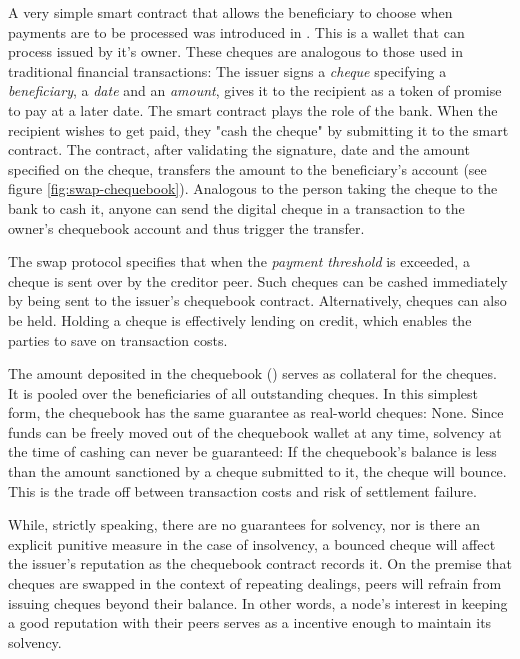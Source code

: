 A very simple smart contract that allows the beneficiary to choose when payments are to be processed was introduced in \cite{ethersphere2016sw3}. This  is a wallet that can process  issued by it's owner. These cheques are analogous to those used in traditional financial transactions: The issuer signs a \emph{cheque} specifying a \emph{beneficiary}, a \emph{date} and an \emph{amount}, gives it to the recipient as a token of promise to pay at a later date. The smart contract plays the role of the bank. When the recipient wishes to get paid, they "cash the cheque" by submitting it to the smart contract. The contract, after validating the signature, date and the amount specified on the cheque, transfers the amount to the beneficiary's account (see figure \ref{fig:swap-chequebook}). Analogous to the person taking the cheque to the bank to cash it, anyone can send the digital cheque in a transaction to the owner's chequebook account and thus trigger the transfer. 

The swap protocol specifies that when the \emph{payment threshold} is exceeded, a cheque is sent over by the creditor peer. Such cheques can be cashed immediately by being sent to the issuer's chequebook contract. Alternatively, cheques can also be held. Holding a cheque is effectively lending on credit, which enables the parties to save on transaction costs. 

The amount deposited in the chequebook () serves as collateral for the cheques. It is pooled over the beneficiaries of all outstanding cheques. In this simplest form, the chequebook has the same guarantee as real-world cheques: None. Since funds can be freely moved out of the chequebook wallet at any time, solvency at the time of cashing can never be guaranteed: If the chequebook's balance is less than the amount sanctioned by a cheque submitted to it, the cheque will bounce. This is the trade off between transaction costs and risk of settlement failure.

While, strictly speaking, there are no guarantees for solvency, nor is there an explicit punitive measure in the case of insolvency, a bounced cheque will affect the issuer's reputation as the chequebook contract records it. On the premise that cheques are swapped in the context of repeating dealings, peers will refrain from issuing cheques beyond their balance. In other words, a node's interest in keeping a good reputation with their peers serves as a incentive enough to maintain its solvency.


